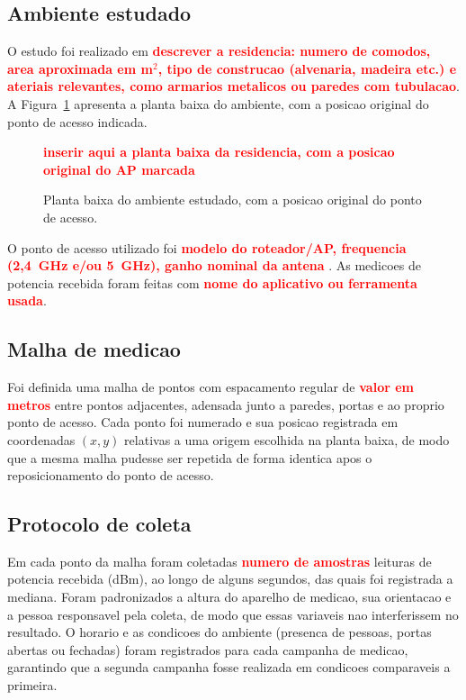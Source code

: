 \subsection{Ambiente estudado}

O estudo foi realizado em \textcolor{red}{\textbf{descrever a residencia: numero de comodos, area aproximada em m$^2$, tipo de construcao (alvenaria, madeira etc.) e  ateriais relevantes, como armarios metalicos ou paredes com tubulacao}}. A Figura~\ref{fig:planta} apresenta a planta baixa do ambiente, com a posicao original do ponto de acesso indicada.

\begin{figure}[ht]
  \centering
 \textcolor{red}{ \textbf{inserir aqui a planta baixa da residencia, com a posicao
  original do AP marcada }}
  \caption{Planta baixa do ambiente estudado, com a posicao original do ponto de acesso.}
  \label{fig:planta}
\end{figure}

O ponto de acesso utilizado foi \textcolor{red}{\textbf{modelo do roteador/AP, frequencia (2,4~GHz e/ou 5~GHz), ganho nominal da antena }}. As medicoes de potencia recebida foram feitas com \textcolor{red}{\textbf{nome do aplicativo ou ferramenta usada}}.

\subsection{Malha de medicao}

Foi definida uma malha de pontos com espacamento regular de \textcolor{red}{\textbf{valor em metros }} entre pontos adjacentes, adensada junto a paredes, portas e ao proprio ponto de acesso. Cada ponto foi numerado e sua posicao registrada em coordenadas $(x, y)$ relativas a uma origem escolhida na planta baixa, de modo que a mesma malha pudesse ser repetida de forma identica apos o reposicionamento do ponto de acesso. 
\subsection{Protocolo de coleta}

Em cada ponto da malha foram coletadas \textcolor{red}{\textbf{numero de amostras}} leituras de potencia recebida (dBm), ao longo de alguns segundos, das quais foi registrada a mediana. Foram padronizados a altura do aparelho de medicao, sua orientacao e a pessoa responsavel pela coleta, de modo que essas variaveis nao interferissem no resultado. O horario e as condicoes do ambiente (presenca de pessoas, portas abertas ou fechadas) foram registrados para cada campanha de medicao, garantindo que a segunda campanha fosse realizada em condicoes comparaveis a primeira.
